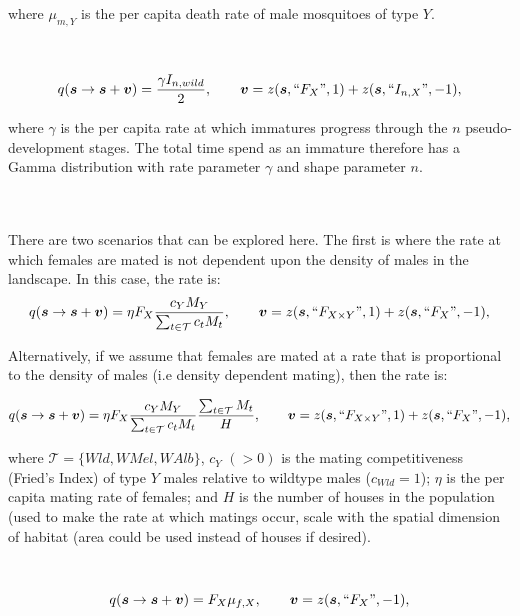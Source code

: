 \documentclass[]{article}  %
\begin{document}
\noindent where $\mu_{m, Y}$ is the per capita death rate of male mosquitoes of type $Y$.
\\
\\
\\
$$q(\boldsymbol{s} \rightarrow \boldsymbol{s} + \boldsymbol{v}) = \frac{ \gamma I_{n, wild}}{2}, \qquad \boldsymbol{v} = z(\boldsymbol{s}, \textup{``}F_X\textup{''} , 1) + z(\boldsymbol{s}, \textup{``} I_{n, X} \textup{''} , -1),$$

\noindent where $\gamma$ is the per capita rate at which immatures progress through the $n$ pseudo-development stages.  The total time spend as an immature therefore has a Gamma distribution with rate parameter $\gamma$ and shape parameter $n$.
\\
\\
\\

There are two scenarios that can be explored here.  The first is where the rate at which females are mated is not dependent upon the density of males in the landscape.  In this case, the rate is:
$$q(\boldsymbol{s} \rightarrow \boldsymbol{s} + \boldsymbol{v}) = \eta F_X \frac{c_Y M_Y}{\sum_{t \in \mathcal{T}} c_t M_t}, \qquad \boldsymbol{v} = z(\boldsymbol{s}, \textup{``}F_{X \times Y}\textup{''} , 1) + z(\boldsymbol{s}, \textup{``} F_X \textup{''} , -1),$$

Alternatively, if we assume that females are mated at a rate that is proportional to the density of males (i.e density dependent mating), then the rate is:

$$q(\boldsymbol{s} \rightarrow \boldsymbol{s} + \boldsymbol{v}) = \eta F_X \frac{c_Y M_Y}{\sum_{t \in \mathcal{T}} c_t M_t}\frac{\sum_{t \in \mathcal{T}} M_t}{H}, \qquad \boldsymbol{v} = z(\boldsymbol{s}, \textup{``}F_{X \times Y}\textup{''} , 1) + z(\boldsymbol{s}, \textup{``} F_X \textup{''} , -1),$$

\noindent where $\mathcal{T} = \{Wld, WMel, WAlb \}$, $c_Y$ $(> 0)$ is the mating competitiveness (Fried's Index) of type $Y$ males relative to wildtype males ($c_{Wld} = 1$); $\eta$ is the per capita mating rate of females; and $H$ is the number of houses in the population (used to make the rate at which matings occur, scale with the spatial dimension of habitat (area could be used instead of houses if desired).
\\
\\
\\
$$q(\boldsymbol{s} \rightarrow \boldsymbol{s} + \boldsymbol{v}) = F_{X} \mu_{f, X}, \qquad \boldsymbol{v} =  z(\boldsymbol{s}, \textup{``} F_{X} \textup{''} , -1),$$
\end{document}
